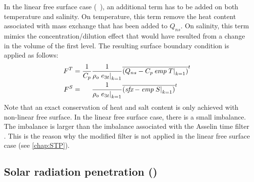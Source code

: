 \documentclass[../main/NEMO_manual]{subfiles}
\begin{document}
In the linear free surface case (~), an additional term has to be added on
both temperature and salinity.
On temperature, this term remove the heat content associated with mass exchange that has been added to $Q_{ns}$.
On salinity, this term mimics the concentration/dilution effect that would have resulted from a change in
the volume of the first level.
The resulting surface boundary condition is applied as follows:
\begin{equation}
  \label{eq:tra_sbc_lin}
  \begin{alignedat}{2}
    F^T &= \frac{1}{C_p} &\frac{1}{\rho_o \left. e_{3t} \right|_{k = 1}}
          &\overline{(Q_{ns}       - C_p \, \textit{emp} \left. T \right|_{k = 1})}^t \\
    F^S &=               &\frac{1}{\rho_o \left. e_{3t} \right|_{k = 1}}
          &\overline{(\textit{sfx} -        \textit{emp} \left. S \right|_{k = 1})}^t
  \end{alignedat}
\end{equation} 
Note that an exact conservation of heat and salt content is only achieved with non-linear free surface.
In the linear free surface case, there is a small imbalance.
The imbalance is larger than the imbalance associated with the Asselin time filter \citep{Leclair_Madec_OM09}.
This is the reason why the modified filter is not applied in the linear free surface case (see \autoref{chap:STP}).

\subsection{Solar radiation penetration (\protect{})}
\label{subsec:TRA_qsr}

\end{document}
